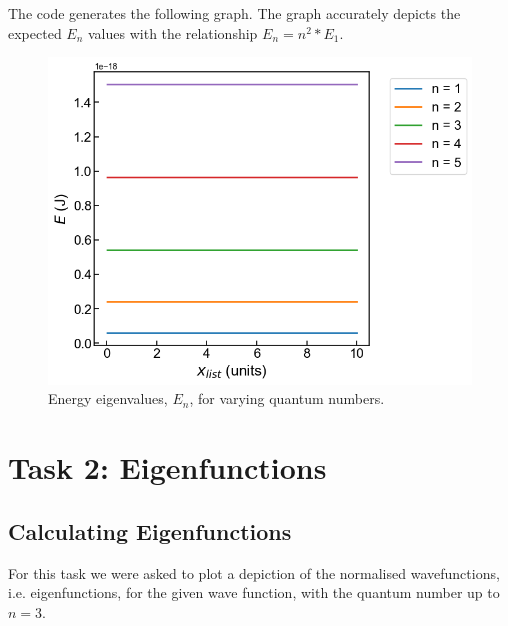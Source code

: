 \documentclass[a4paper,12pt]{article}
\begin{document}
The code generates the following graph. The graph accurately depicts the expected \(E_n\) values with the relationship \(E_n = n^2 * E_1 \).
\begin{figure}[H]          
    \includegraphics[width=\columnwidth]{report/figures/E_n.png}
    \caption{Energy eigenvalues, \(E_n\), for varying quantum numbers. }
    \label{fig:enter-label}
\end{figure}

\section{Task 2: Eigenfunctions}
\subsection{Calculating Eigenfunctions}
For this task we were asked to plot a depiction of the normalised wavefunctions, i.e. eigenfunctions, for the given wave function, with the quantum number up to \(n=3\). 
\end{document}
